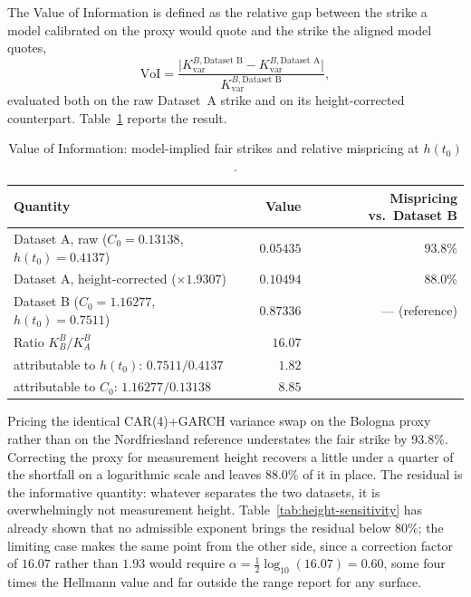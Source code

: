 \documentclass[11pt, a4paper, twoside]{article}
\begin{document}
The Value of Information is defined as the relative gap between the strike a model calibrated on the proxy would quote and the strike the aligned model quotes,
\begin{equation}
\mathrm{VoI} = \frac{\bigl|K_{\text{var}}^{B,\text{Dataset B}} - K_{\text{var}}^{B,\text{Dataset A}}\bigr|}{K_{\text{var}}^{B,\text{Dataset B}}},
\end{equation}
evaluated both on the raw Dataset~A strike and on its height-corrected counterpart. Table~\ref{tab:voi} reports the result.

\begin{table}[htbp]
\centering
\small
\caption{Value of Information: model-implied fair strikes and relative mispricing at $h(t_0)$.}
\label{tab:voi}
\begin{tabular}{l r r}
\toprule
\textbf{Quantity} & \textbf{Value} & \textbf{Mispricing vs.\ Dataset B} \\
\midrule
Dataset A, raw ($C_0 = 0.13138$, $h(t_0) = 0.4137$) & $0.05435$ & $93.8\%$ \\
Dataset A, height-corrected ($\times 1.9307$) & $0.10494$ & $88.0\%$ \\
Dataset B ($C_0 = 1.16277$, $h(t_0) = 0.7511$) & $0.87336$ & --- (reference) \\
\midrule
Ratio $K^B_B / K^B_A$ & $16.07$ & \\
\quad attributable to $h(t_0)$: $0.7511/0.4137$ & $1.82$ & \\
\quad attributable to $C_0$: $1.16277/0.13138$ & $8.85$ & \\
\bottomrule
\end{tabular}
\end{table}

Pricing the identical CAR(4)+GARCH variance swap on the Bologna proxy rather than on the Nordfriesland reference understates the fair strike by 93.8\%. Correcting the proxy for measurement height recovers a little under a quarter of the shortfall on a logarithmic scale and leaves 88.0\% of it in place. The residual is the informative quantity: whatever separates the two datasets, it is overwhelmingly not measurement height. Table~\ref{tab:height-sensitivity} has already shown that no admissible exponent brings the residual below $80\%$; the limiting case makes the same point from the other side, since a correction factor of $16.07$ rather than $1.93$ would require $\alpha = \tfrac12\log_{10}(16.07) = 0.60$, some four times the Hellmann value and far outside the range \citet{PetersonHennessey1978} report for any surface.
\end{document}
